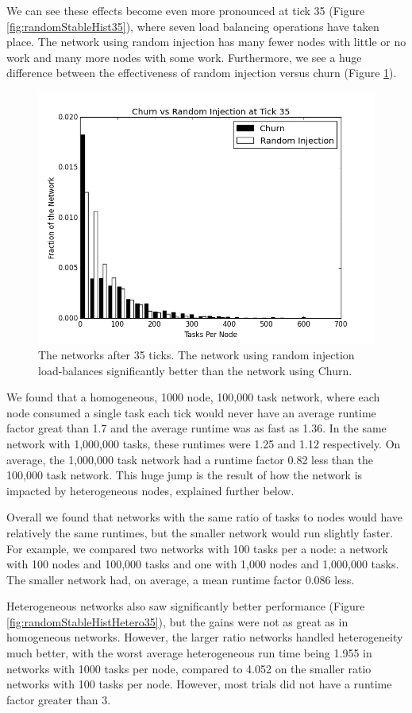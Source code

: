 We can see these effects become even more pronounced at tick 35 (Figure \ref{fig:randomStableHist35}), where seven load balancing operations have taken place.
The network using random injection has many fewer nodes with little or no work and many more nodes with some work.
Furthermore, we see a huge difference between the effectiveness of random injection versus churn (Figure \ref{fig:churnInjectionHist35}).

\begin{figure}
	\centering
	\includegraphics[width=0.7\linewidth]{figs/churnInjectionHist35}
	\caption[Churn vs Random Injection after 35 ticks.]{The networks after 35 ticks.  The network using random injection load-balances significantly better than the network using Churn.}
	\label{fig:churnInjectionHist35}
\end{figure}

We found that a homogeneous, 1000 node, 100,000 task network, where each node consumed a single task each tick would never have an average runtime factor great than 1.7 and the average runtime was as fast as 1.36.
In the same network with 1,000,000 tasks, these runtimes were 1.25 and 1.12 respectively.
On average, the 1,000,000 task network had a runtime factor 0.82 less than the 100,000 task network.
This huge jump is the result of how the network is impacted by heterogeneous nodes, explained further below.

Overall we found that networks with the same ratio of tasks to nodes would have relatively the same runtimes, but the smaller network would run slightly faster.
For example, we compared two networks with 100 tasks per a node: a network with 100 nodes and 100,000 tasks and one with 1,000 nodes and 1,000,000 tasks.
The smaller network had, on average, a mean runtime factor 0.086 less.

Heterogeneous networks also saw significantly better performance (Figure \ref{fig:randomStableHistHetero35}), but the gains were not as great as in homogeneous networks.
However, the larger ratio networks handled heterogeneity much better, with the worst average heterogeneous run time being 1.955 in networks with 1000 tasks per node, compared to 4.052 on the smaller ratio networks with 100 tasks per node.
However, most trials did not have a runtime factor greater than 3.


